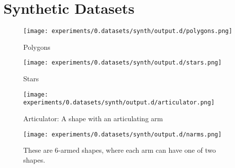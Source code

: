 
\FloatBarrier

\section{Synthetic Datasets}

\begin{figure}
\texttt{[image: experiments/0.datasets/synth/output.d/polygons.png]}
\caption{Polygons}
\end{figure}

\begin{figure}
\texttt{[image: experiments/0.datasets/synth/output.d/stars.png]}
\caption{Stars}
\end{figure}

\begin{figure}
\texttt{[image: experiments/0.datasets/synth/output.d/articulator.png]}
\caption{Articulator: A shape with an articulating arm}
\end{figure}

\begin{figure}
\texttt{[image: experiments/0.datasets/synth/output.d/narms.png]}
\caption{These are 6-armed shapes, where each arm can have one of two shapes.}
\end{figure}